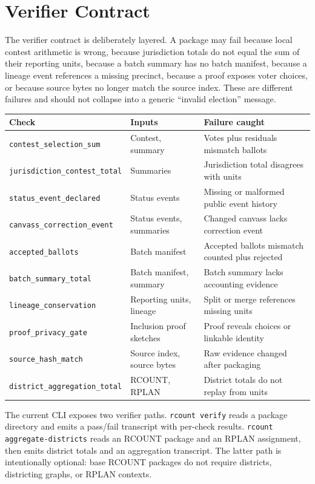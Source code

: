 \section{Verifier Contract}

The verifier contract is deliberately layered. A package may fail because local
contest arithmetic is wrong, because jurisdiction totals do not equal the sum of
their reporting units, because a batch summary has no batch manifest, because a
lineage event references a missing precinct, because a proof exposes voter
choices, or because source bytes no longer match the source index. These are
different failures and should not collapse into a generic ``invalid election''
message.

\begin{center}
\small
\begin{tabularx}{\textwidth}{lXX}
\toprule
Check & Inputs & Failure caught \\
\midrule
\texttt{contest\_selection\_sum} & Contest, summary & Votes plus residuals mismatch ballots \\
\texttt{jurisdiction\_contest\_total} & Summaries & Jurisdiction total disagrees with units \\
\texttt{status\_event\_declared} & Status events & Missing or malformed public event history \\
\texttt{canvass\_correction\_event} & Status events, summaries & Changed canvass lacks correction event \\
\texttt{accepted\_ballots} & Batch manifest & Accepted ballots mismatch counted plus rejected \\
\texttt{batch\_summary\_total} & Batch manifest, summary & Batch summary lacks accounting evidence \\
\texttt{lineage\_conservation} & Reporting units, lineage & Split or merge references missing units \\
\texttt{proof\_privacy\_gate} & Inclusion proof sketches & Proof reveals choices or linkable identity \\
\texttt{source\_hash\_match} & Source index, source bytes & Raw evidence changed after packaging \\
\texttt{district\_aggregation\_total} & RCOUNT, RPLAN & District totals do not replay from units \\
\bottomrule
\end{tabularx}
\end{center}

The current CLI exposes two verifier paths. \texttt{rcount verify} reads a
package directory and emits a pass/fail transcript with per-check results.
\texttt{rcount aggregate-districts} reads an RCOUNT package and an RPLAN
assignment, then emits district totals and an aggregation transcript. The latter
path is intentionally optional: base RCOUNT packages do not require districts,
districting graphs, or RPLAN contexts.

